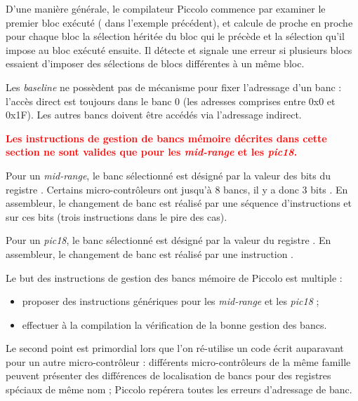 D'une manière générale, le compilateur Piccolo commence par examiner le premier bloc exécuté ( dans l'exemple précédent), et calcule de proche en proche pour chaque bloc la sélection héritée du bloc qui le précède et la sélection qu'il impose au bloc exécuté ensuite. Il détecte et signale une erreur si plusieurs blocs essaient d'imposer des sélections de blocs différentes à un même bloc.














Les \emph{baseline} ne possèdent pas de mécanisme pour fixer l'adressage d'un banc : l'accès direct est toujours dans le banc 0 (les adresses comprises entre 0x0 et 0x1F). Les autres bancs doivent être accédés via l'adressage indirect.

\textcolor{red}{\bf Les instructions de gestion de bancs mémoire décrites dans cette section ne sont valides que pour les \emph{mid-range} et les \emph{pic18}.}

Pour un \emph{mid-range}, le banc sélectionné est désigné par la valeur des bits  du registre . Certains micro-contrôleurs ont jusqu'à 8 bancs, il y a donc 3 bits . En assembleur, le changement de banc est réalisé par une séquence d'instructions  et  sur ces bits (trois instructions dans le pire des cas). 


Pour un \emph{pic18}, le banc sélectionné est désigné par la valeur du registre . En assembleur, le changement de banc est réalisé par une instruction .

Le but des instructions de gestion des bancs mémoire de Piccolo est multiple :
\begin{itemize}
  \item proposer des instructions génériques pour les \emph{mid-range} et les \emph{pic18} ;
  \item effectuer à la compilation la vérification de la bonne gestion des bancs.
\end{itemize}

Le second point est primordial lors que l'on ré-utilise un code écrit auparavant pour un autre micro-contrôleur : différents micro-contrôleurs de la même famille peuvent présenter des différences de localisation de bancs pour des registres spéciaux de même nom ; Piccolo repérera toutes les erreurs d'adressage de banc.

